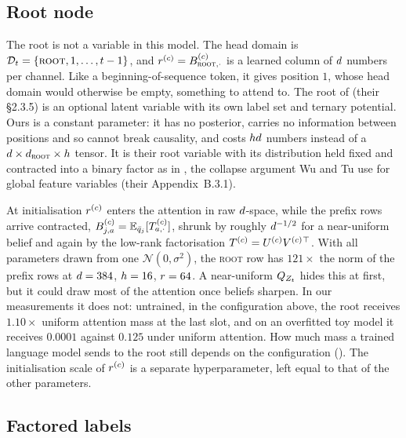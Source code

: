 \subsection{Root node}
\label{app:root}

The root is not a variable in this model. The head domain is
$\mathcal{D}_{t} = \{\textsc{root},1,\dots,t-1\}$, and $r^{(c)} = B^{(c)}_{\textsc{root},\cdot}$ is a
learned column of $d$ numbers per channel. Like a beginning-of-sequence token, it gives
position $1$, whose head domain would otherwise be empty, something to attend to. The root of
\citet{wu2023probabilistic} (their \S2.3.5) is an optional latent variable with its own label set
and ternary potential. Ours is a constant parameter: it has no posterior, carries no information
between positions and so cannot break causality, and costs $hd$ numbers instead of a
$d \times d_{\textsc{root}} \times h$ tensor. It is their root variable with its
distribution held fixed and contracted into a binary factor as in , the
collapse argument Wu and Tu use for global feature variables (their Appendix~B.3.1).

At initialisation $r^{(c)}$ enters the attention in raw $d$-space, while the prefix rows
arrive contracted, $B^{(c)}_{j,a} = \mathbb{E}_{\bar{q}_{j}}[T^{(c)}_{a,\cdot}]$, shrunk by roughly
$d^{-1/2}$ for a near-uniform belief and again by the low-rank factorisation
$T^{(c)}=U^{(c)}V^{(c)}{}^{\top}$. With all parameters
drawn from one $\mathcal{N}(0,\sigma^2)$, the \textsc{root} row has $121\times$ the norm of the
prefix rows at $d=384$, $h=16$, $r=64$. A near-uniform $Q_{Z_{t}}$ hides this at
first, but it could draw most of the attention once beliefs sharpen. In our measurements it
does not: untrained, in the configuration above, the root receives $1.10\times$ uniform attention
mass at the last slot, and on an overfitted toy model it receives $0.0001$ against $0.125$ under
uniform attention. How much mass a trained language model sends to the root still depends on the
configuration (). The initialisation scale of $r^{(c)}$ is a separate
hyperparameter, left equal to that of the other parameters.

\subsection{Factored labels}
\label{app:factored}

